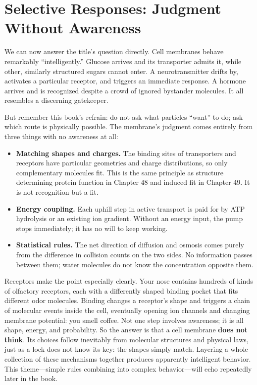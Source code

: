 \section{Selective Responses: Judgment Without Awareness}

We can now answer the title's question directly. Cell membranes behave remarkably ``intelligently.'' Glucose arrives and its transporter admits it, while other, similarly structured sugars cannot enter. A neurotransmitter drifts by, activates a particular receptor, and triggers an immediate response. A hormone arrives and is recognized despite a crowd of ignored bystander molecules. It all resembles a discerning gatekeeper.

But remember this book's refrain: do not ask what particles ``want'' to do; ask which route is physically possible. The membrane's judgment comes entirely from three things with no awareness at all:

\begin{itemize}[itemsep=2pt]
\item \textbf{Matching shapes and charges.} The binding sites of transporters and receptors have particular geometries and charge distributions, so only complementary molecules fit. This is the same principle as structure determining protein function in Chapter 48 and induced fit in Chapter 49. It is not recognition but a fit.
\item \textbf{Energy coupling.} Each uphill step in active transport is paid for by ATP hydrolysis or an existing ion gradient. Without an energy input, the pump stops immediately; it has no will to keep working.
\item \textbf{Statistical rules.} The net direction of diffusion and osmosis comes purely from the difference in collision counts on the two sides. No information passes between them; water molecules do not know the concentration opposite them.
\end{itemize}

Receptors make the point especially clearly. Your nose contains hundreds of kinds of olfactory receptors, each with a differently shaped binding pocket that fits different odor molecules. Binding changes a receptor's shape and triggers a chain of molecular events inside the cell, eventually opening ion channels and changing membrane potential: you smell coffee. Not one step involves awareness; it is all shape, energy, and probability. So the answer is that a cell membrane \textbf{does not think}. Its choices follow inevitably from molecular structures and physical laws, just as a lock does not know its key: the shapes simply match. Layering a whole collection of these mechanisms together produces apparently intelligent behavior. This theme---simple rules combining into complex behavior---will echo repeatedly later in the book.

